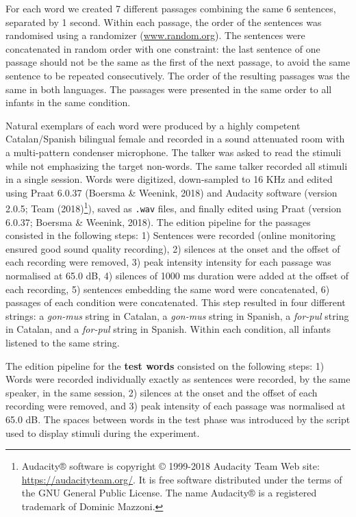 \documentclass[man,floatsintext]{apa6}
\let\rmarkdownfootnote\footnote%
\def\footnote{\protect\rmarkdownfootnote}
\begin{document}
For each word we created 7 different passages combining the same 6 sentences, separated by 1 second. Within each passage, the order of the sentences was randomised using a randomizer (\url{www.random.org}). The sentences were concatenated in random order with one constraint: the last sentence of one passage should not be the same as the first of the next passage, to avoid the same sentence to be repeated consecutively. The order of the resulting passages was the same in both languages. The passages were presented in the same order to all infants in the same condition.

Natural exemplars of each word were produced by a highly competent Catalan/Spanish bilingual female and recorded in a sound attenuated room with a multi-pattern condenser microphone. The talker was asked to read the stimuli while not emphasizing the target non-words. The same talker recorded all stimuli in a single session. Words were digitized, down-sampled to 16 KHz and edited using Praat 6.0.37 (Boersma \& Weenink, 2018) and Audacity software (version 2.0.5; Team (2018)\footnote{Audacity® software is copyright © 1999-2018 Audacity Team Web site: \url{https://audacityteam.org/}. It is free software distributed under the terms of the GNU General Public License. The name Audacity® is a registered trademark of Dominic Mazzoni.}), saved as \texttt{.wav} files, and finally edited using Praat (version 6.0.37; Boersma \& Weenink, 2018). The edition pipeline for the passages consisted in the following steps: 1) Sentences were recorded (online monitoring ensured good sound quality recording), 2) silences at the onset and the offset of each recording were removed, 3) peak intensity intensity for each passage was normalised at 65.0 dB, 4) silences of 1000 ms duration were added at the offset of each recording, 5) sentences embedding the same word were concatenated, 6) passages of each condition were concatenated. This step resulted in four different strings: a \emph{gon-mus} string in Catalan, a \emph{gon-mus} string in Spanish, a \emph{for-pul} string in Catalan, and a \emph{for-pul} string in Spanish. Within each condition, all infants listened to the same string.

The edition pipeline for the \textbf{test words} consisted on the following steps: 1) Words were recorded individually exactly as sentences were recorded, by the same speaker, in the same session, 2) silences at the onset and the offset of each recording were removed, and 3) peak intensity of each passage was normalised at 65.0 dB. The spaces between words in the test phase was introduced by the script used to display stimuli during the experiment.
\end{document}
